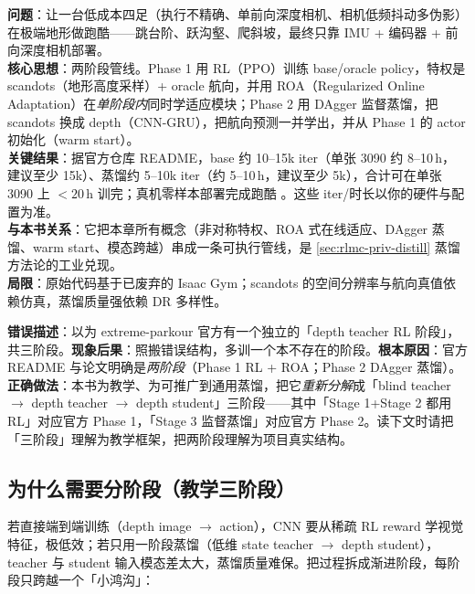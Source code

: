 \begin{paper}\label{paper:rlmc-priv-parkour}
\textbf{问题}：让一台低成本四足（执行不精确、单前向深度相机、相机低频抖动多伪影）在极端地形做跑酷——跳台阶、跃沟壑、爬斜坡，最终只靠 IMU + 编码器 + 前向深度相机部署。\\
\textbf{核心思想}：两阶段管线。Phase 1 用 RL（PPO）训练 base/oracle policy，特权是 scandots（地形高度采样）+ oracle 航向，并用 ROA（Regularized Online Adaptation）在\emph{单阶段内}同时学适应模块；Phase 2 用 DAgger 监督蒸馏，把 scandots 换成 depth（CNN-GRU），把航向预测一并学出，并从 Phase 1 的 actor 初始化（warm start）。\\
\textbf{关键结果}：据官方仓库 README，base 约 10--15k iter（单张 3090 约 8--10\,h，建议至少 15k）、蒸馏约 5--10k iter（约 5--10\,h，建议至少 5k），合计可在单张 3090 上 $<20$\,h 训完；真机零样本部署完成跑酷 \cite{cheng2024parkour}。这些 iter/时长以你的硬件与配置为准。\\
\textbf{与本书关系}：它把本章所有概念（非对称特权、ROA 式在线适应、DAgger 蒸馏、warm start、模态跨越）串成一条可执行管线，是 \cref{sec:rlmc-priv-distill} 蒸馏方法论的工业兑现。\\
\textbf{局限}：原始代码基于已废弃的 Isaac Gym；scandots 的空间分辨率与航向真值依赖仿真，蒸馏质量强依赖 DR 多样性。
\end{paper}

\begin{pitfall}
\textbf{错误描述}：以为 extreme-parkour 官方有一个独立的「depth teacher RL 阶段」，共三阶段。\textbf{现象后果}：照搬错误结构，多训一个本不存在的阶段。\textbf{根本原因}：官方 README 与论文明确是\emph{两阶段}（Phase 1 RL + ROA；Phase 2 DAgger 蒸馏）。\textbf{正确做法}：本书为教学、为可推广到通用蒸馏，把它\emph{重新分解}成「blind teacher $\to$ depth teacher $\to$ depth student」三阶段——其中「Stage 1+Stage 2 都用 RL」对应官方 Phase 1，「Stage 3 监督蒸馏」对应官方 Phase 2。读下文时请把「三阶段」理解为教学框架，把两阶段理解为项目真实结构。
\end{pitfall}

\subsection{为什么需要分阶段（教学三阶段）}
\label{sec:rlmc-priv-whystages}

若直接端到端训练（depth image $\to$ action），CNN 要从稀疏 RL reward 学视觉特征，极低效；若只用一阶段蒸馏（低维 state teacher $\to$ depth student），teacher 与 student 输入模态差太大，蒸馏质量难保。把过程拆成渐进阶段，每阶段只跨越一个「小鸿沟」：

